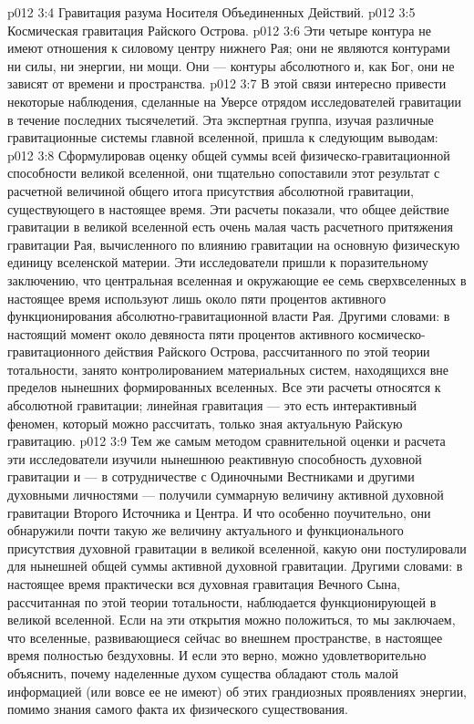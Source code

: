 \vs p012 3:4 \bibnobreakspace Гравитация разума Носителя Объединенных Действий.
\vs p012 3:5 \bibnobreakspace Космическая гравитация Райского Острова.
\vs p012 3:6 \pc Эти четыре контура не имеют отношения к силовому центру нижнего Рая; они не являются контурами ни силы, ни энергии, ни мощи. Они --- контуры абсолютного  и, как Бог, они не зависят от времени и пространства.
\vs p012 3:7 В этой связи интересно привести некоторые наблюдения, сделанные на Уверсе отрядом исследователей гравитации в течение последних тысячелетий. Эта экспертная группа, изучая различные гравитационные системы главной вселенной, пришла к следующим выводам:
\vs p012 3:8 \pc {}\bibnobreakspace {} Сформулировав оценку общей суммы всей физическо\hyp{}гравитационной способности великой вселенной, они тщательно сопоставили этот результат с расчетной величиной общего итога присутствия абсолютной гравитации, существующего в настоящее время. Эти расчеты показали, что общее действие гравитации в великой вселенной есть очень малая часть расчетного притяжения гравитации Рая, вычисленного по влиянию гравитации на основную физическую единицу вселенской материи. Эти исследователи пришли к поразительному заключению, что центральная вселенная и окружающие ее семь сверхвселенных в настоящее время используют лишь около пяти процентов активного функционирования абсолютно\hyp{}гравитационной власти Рая. Другими словами: в настоящий момент около девяноста пяти процентов активного космическо\hyp{}гравитационного действия Райского Острова, рассчитанного по этой теории тотальности, занято контролированием материальных систем, находящихся вне пределов нынешних формированных вселенных. Все эти расчеты относятся к абсолютной гравитации; линейная гравитация --- это есть интерактивный феномен, который можно рассчитать, только зная актуальную Райскую гравитацию.
\vs p012 3:9 \pc {}\bibnobreakspace {} Тем же самым методом сравнительной оценки и расчета эти исследователи изучили нынешнюю реактивную способность духовной гравитации и --- в сотрудничестве с Одиночными Вестниками и другими духовными личностями --- получили суммарную величину активной духовной гравитации Второго Источника и Центра. И что особенно поучительно, они обнаружили почти такую же величину актуального и функционального присутствия духовной гравитации в великой вселенной, какую они постулировали для нынешней общей суммы активной духовной гравитации. Другими словами: в настоящее время практически вся духовная гравитация Вечного Сына, рассчитанная по этой теории тотальности, наблюдается функционирующей в великой вселенной. Если на эти открытия можно положиться, то мы заключаем, что вселенные, развивающиеся сейчас во внешнем пространстве, в настоящее время полностью бездуховны. И если это верно, можно удовлетворительно объяснить, почему наделенные духом существа обладают столь малой информацией (или вовсе ее не имеют) об этих грандиозных проявлениях энергии, помимо знания самого факта их физического существования.
